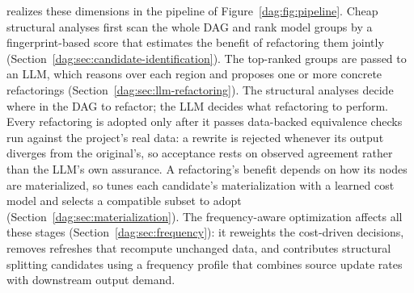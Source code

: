 
\dagsmith{} realizes these dimensions in the pipeline of Figure~\ref{dag:fig:pipeline}. Cheap structural analyses first scan the whole DAG and rank model groups by a fingerprint-based score that estimates the benefit of refactoring them jointly (Section~\ref{dag:sec:candidate-identification}). The top-ranked groups are passed to an LLM, which reasons over each region and proposes one or more concrete refactorings (Section~\ref{dag:sec:llm-refactoring}). 
The structural analyses decide where in the DAG to refactor; the LLM decides what refactoring to perform.
Every refactoring is adopted only after it passes data-backed equivalence checks run against the project's real data: a rewrite is rejected whenever its output diverges from the original's, so acceptance rests on observed agreement rather than the LLM's own assurance.
A refactoring's benefit depends on how its nodes are materialized, so \dagsmith{} tunes each candidate's materialization with a learned cost model and selects a compatible subset to adopt (Section~\ref{dag:sec:materialization}). The frequency-aware optimization affects all these stages (Section~\ref{dag:sec:frequency}): it reweights the cost-driven decisions, removes refreshes that recompute unchanged data, and contributes structural splitting candidates using a frequency profile that combines source update rates with downstream output demand.






